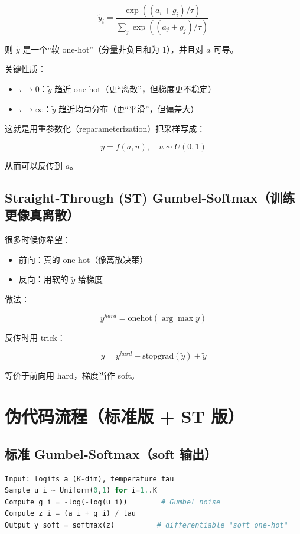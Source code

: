 \[
\tilde{y}_i = \frac{\exp\left((a_i + g_i)/\tau\right)}{\sum_j \exp\left((a_j + g_j)/\tau\right)}
\]

则 \(\tilde{y}\) 是一个“软 one-hot”（分量非负且和为 1），并且对 \(a\) 可导。

关键性质：

\begin{itemize}
  \item \(\tau \to 0\)：\(\tilde{y}\) 趋近 one-hot（更“离散”，但梯度更不稳定）
  \item \(\tau \to \infty\)：\(\tilde{y}\) 趋近均匀分布（更“平滑”，但偏差大）
\end{itemize}

这就是用重参数化（reparameterization）把采样写成：

\[
\tilde{y}=f(a, u),\quad u\sim U(0,1)
\]

从而可以反传到 \(a\)。

\subsection{Straight-Through (ST) Gumbel-Softmax（训练更像真离散）}

很多时候你希望：

\begin{itemize}
  \item 前向：真的 one-hot（像离散决策）
  \item 反向：用软的 \(\tilde{y}\) 给梯度
\end{itemize}

做法：

\[
y^{hard}=\text{onehot}(\arg\max \tilde{y})
\]

反传时用 trick：

\[
y = y^{hard} - \text{stopgrad}(\tilde{y}) + \tilde{y}
\]

等价于前向用 hard，梯度当作 soft。

\section{伪代码流程（标准版 + ST 版）}

\subsection{标准 Gumbel-Softmax（soft 输出）}

\begin{lstlisting}[language=python]
Input: logits a (K-dim), temperature tau
Sample u_i ~ Uniform(0,1) for i=1..K
Compute g_i = -log(-log(u_i))        # Gumbel noise
Compute z_i = (a_i + g_i) / tau
Output y_soft = softmax(z)          # differentiable "soft one-hot"
\end{lstlisting}

